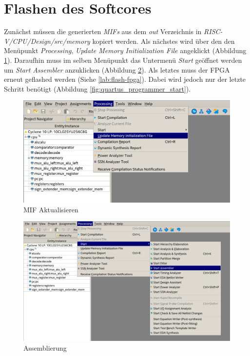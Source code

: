     \section{Flashen des Softcores}

        Zunächst müssen die generierten \textit{MIFs} aus dem \textit{out} Verzeichnis in
        \textit{RISC-V/CPU/Design/src/memory} kopiert werden.
        Als nächstes wird über den den Menüpunkt \textit{Processing},
        \textit{Update Memory Initialization File} angeklickt (Abbildung \ref{fig:update-mif}).
        Daraufhin muss im selben Menüpunkt das Untermenü \textit{Start} geöffnet werden um
        \textit{Start Assembler} anzuklicken (Abbildung \ref{fig:start-asm}).
        Als letztes muss der FPGA erneut geflashed werden (Siehe \ref{lab:flash-fpga}).
        Dabei wird jedoch nur der letzte Schritt benötigt (Abbildung \ref{fig:quartus_programmer_start}).


        \begin{figure}[H]
            \centering
            \includegraphics[scale=0.6]{img/update_mif.png}
            \caption{MIF Aktualisieren}
            \label{fig:update-mif}
        \end{figure}

        \begin{figure}[H]
            \centering
            \includegraphics[scale=0.5]{img/start_assembler.png}
            \caption{Assemblierung}
            \label{fig:start-asm}
        \end{figure}


